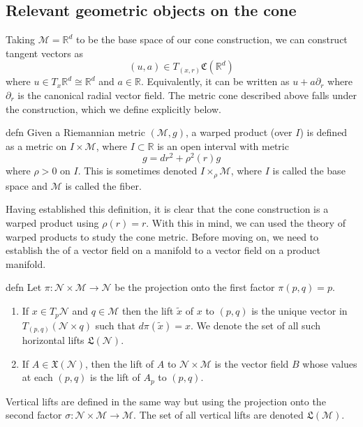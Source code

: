 \documentclass{article}
\newcommand{\man}{\mathcal{M}}
\begin{document}
\subsection{Relevant geometric objects on the cone}

Taking $\man = \mathbb{R}^d$ to be the base space of our cone construction, we can construct tangent vectors as
\begin{equation}
    (u, a) \in T_{(x,r)}\mathfrak{C}(\mathbb{R}^d)
\end{equation}
where $u \in T_x\mathbb{R}^d \cong \mathbb{R}^d$ and $a \in \mathbb{R}$. Equivalently, it can be written as $u + a\partial_r$ where $\partial_r$ is the canonical radial vector field. The metric cone described above falls under the  construction, which we define explicitly below. 
\begin{restatable}{defn}{}
    Given a Riemannian metric $(\man, g)$, a warped product (over $I$) is defined as a metric on $I \times \man$, where $I \subset \mathbb{R}$ is an open interval with metric 
    \[g = dr^2 + \rho^2(r)g\]
    where $\rho > 0$ on $I$. This is sometimes denoted $I \times_{\rho} \man$, where $I$ is called the base space and $\man$ is called the fiber.
\end{restatable}
Having established this definition, it is clear that the cone construction is a warped product using $\rho(r) = r$. With this in mind, we can used the theory of warped products to study the cone metric. Before moving on, we need to establish the  of a vector field on a manifold to a vector field on a product manifold.

\begin{restatable}{defn}{}
    Let $\pi: \mathcal{N} \times \man\rightarrow \mathcal{N}$ be the projection onto the first factor $\pi(p, q) = p$. 
    \begin{enumerate}
        \item If $x \in T_p\mathcal{N}$ and $q \in \mathcal{M}$ then the lift $\tilde{x}$ of $x$ to $(p,q)$ is the unique vector in $T_{(p,q)}(\mathcal{N} \times q)$ such that $d\pi(\tilde{x}) = x$. We denote the set of all such horizontal lifts $\mathfrak{L}(\mathcal{N}).$
        \item If $A \in \mathfrak{X}(\mathcal{N})$, then the lift of $A$ to $\mathcal{N} \times \man$ is the vector field $B$ whose values at each $(p,q)$ is the lift of $A_p$ to $(p,q).$
    \end{enumerate}
    Vertical lifts are defined in the same way but using the projection onto the second factor $\sigma: \mathcal{N} \times \man \rightarrow \man$. The set of all vertical lifts are denoted $\mathfrak{L}(\man).$ 
\end{restatable}
\end{document}
